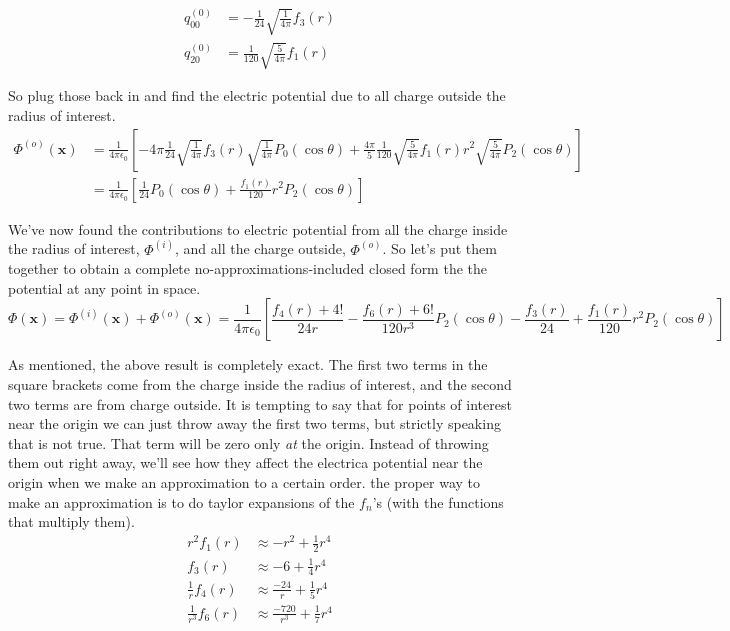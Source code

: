 \documentclass[10pt,a4paper]{article}
\begin{document}
\begin{subequations}\begin{align}
q^{(0)}_{00} &= -\frac{1}{24} \sqrt{\frac{1}{4\pi}}f_3(r) \\
q^{(0)}_{20} &= \frac{1}{120} \sqrt{\frac{5}{4\pi}}f_1(r)
\end{align}\end{subequations}

So plug those back in and find the electric potential due to all charge outside the radius of interest.
\begin{align}
\Phi^{(o)}(\mathbf{x})&=\frac{1}{4\pi\epsilon_0}\left[-4\pi\frac{1}{24}\sqrt{\frac{1}{4\pi}}f_3(r)\sqrt{\frac{1}{4\pi}}P_0(\cos\theta)+\frac{4\pi}{5}\frac{1}{120}\sqrt{\frac{5}{4\pi}}f_1(r)r^2\sqrt{\frac{5}{4\pi}}P_2(\cos\theta)\right] \\
&=\frac{1}{4\pi\epsilon_0}\left[\frac{1}{24}P_0(\cos\theta)+\frac{f_1(r)}{120}r^2P_2(\cos\theta)\right]
\end{align}

We've now found the contributions to electric potential from all the charge inside the radius of interest, $\Phi^{(i)}$, and all the charge outside, $\Phi^{(o)}$.  So let's put them together to obtain a complete no-approximations-included closed form the the potential at any point in space.
\begin{equation}\boxed{
\Phi(\mathbf{x})=\Phi^{(i)}(\mathbf{x})+\Phi^{(o)}(\mathbf{x})=
\frac{1}{4\pi\epsilon_0}\left[\frac{f_4(r)+4!}{24r}-\frac{f_6(r)+6!}{120r^3}P_2(\cos\theta)-\frac{f_3(r)}{24}+\frac{f_1(r)}{120}r^2P_2(\cos\theta)\right]
}\end{equation}

As mentioned, the above result is completely exact.  The first two terms in the square brackets come from the charge inside the radius of interest, and the second two terms are from charge outside.  It is tempting to say that for points of interest near the origin we can just throw away the first two terms, but strictly speaking that is not true.  That term will be zero only \textit{at} the origin.  Instead of throwing them out right away, we'll see how they affect the electrica potential near the origin when we make an approximation to a certain order.  the proper way to make an approximation is to do taylor expansions of the $f_n$'s (with the functions that multiply them).
\begin{subequations}\begin{align}
r^2f_1(r) &\approx-r^2+\frac{1}{2}r^4 \\
f_3(r)&\approx-6+\frac{1}{4}r^4 \\
\frac{1}{r}f_4(r) &\approx \frac{-24}{r}+\frac{1}{5}r^4 \\
\frac{1}{r^3}f_6(r) &\approx \frac{-720}{r^3}+\frac{1}{7}r^4
\end{align}\end{subequations}
\end{document}
